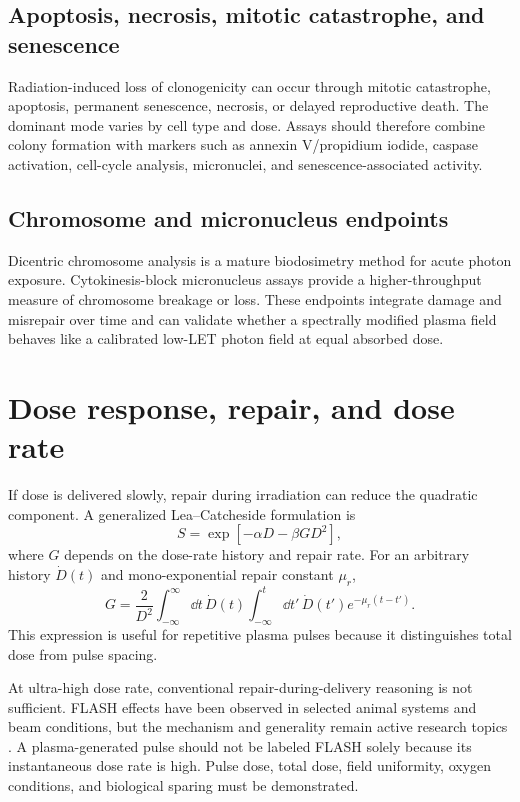 \subsection{Apoptosis, necrosis, mitotic catastrophe, and senescence}

Radiation-induced loss of clonogenicity can occur through mitotic catastrophe, apoptosis, permanent senescence, necrosis, or delayed reproductive death. The dominant mode varies by cell type and dose. Assays should therefore combine colony formation with markers such as annexin V/propidium iodide, caspase activation, cell-cycle analysis, micronuclei, and senescence-associated activity.

\subsection{Chromosome and micronucleus endpoints}

Dicentric chromosome analysis is a mature biodosimetry method for acute photon exposure. Cytokinesis-block micronucleus assays provide a higher-throughput measure of chromosome breakage or loss. These endpoints integrate damage and misrepair over time and can validate whether a spectrally modified plasma field behaves like a calibrated low-LET photon field at equal absorbed dose.

\section{Dose response, repair, and dose rate}

If dose is delivered slowly, repair during irradiation can reduce the quadratic component. A generalized Lea--Catcheside formulation is
\begin{equation}
S=\exp[-\alpha D-\beta GD^2],
\end{equation}
where $G$ depends on the dose-rate history and repair rate. For an arbitrary history $\dot D(t)$ and mono-exponential repair constant $\mu_r$,
\begin{equation}
G=\frac{2}{D^2}\int_{-\infty}^{\infty}\dd t\,\dot D(t)
\int_{-\infty}^{t}\dd t'\,\dot D(t')e^{-\mu_r(t-t')}.
\label{eq:lea-catcheside}
\end{equation}
This expression is useful for repetitive plasma pulses because it distinguishes total dose from pulse spacing.

At ultra-high dose rate, conventional repair-during-delivery reasoning is not sufficient. FLASH effects have been observed in selected animal systems and beam conditions, but the mechanism and generality remain active research topics \cite{favaudon2014,montay2019,abolfath2020}. A plasma-generated pulse should not be labeled FLASH solely because its instantaneous dose rate is high. Pulse dose, total dose, field uniformity, oxygen conditions, and biological sparing must be demonstrated.

